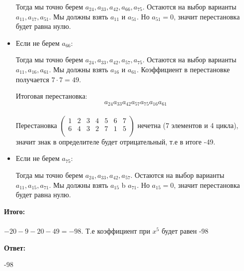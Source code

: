 \documentclass[a4paper,12pt]{article}
\begin{document}
\begin{itemize}
Тогда мы точно берем $a_{24}, a_{33}, a_{42}, a_{66}, a_{75}$. Остаются на выбор варианты $a_{11}, a_{17}, a_{51}$. Мы должны взять $a_11$ и $a_{51}$.  Но $a_{51} = 0$, значит перестановка будет равна нулю.

\item Если не берем $a_{66}$:

Тогда мы точно берем $a_{24}, a_{33}, a_{42}, a_{57}, a_{75}$. Остаются на выбор варианты $a_{11}, a_{16}, a_{61}$. Мы должны взять $a_{16} $ и $a_{61}$. Коэффициент в перестановке получается $7 \cdot 7 = 49$. 

Итоговая перестановка:
\[
a_{24}a_{33}a_{42}a_{57}a_{75} a_{16} a_{61}
\]
\\
Перестановка $\begin{pmatrix}
1 & 2 & 3 & 4 & 5 & 6 & 7\\
6 & 4 & 3& 2& 7 & 1& 5 \\
\end{pmatrix}$ нечетна (7 элементов и 4 цикла), значит знак в определителе будет отрицательный, т.е в итоге -49.
\item Если не берем $a_{75}$:

Тогда мы точно берем $a_{24}, a_{33}, a_{42}, a_{57}$. Остаются на выбор варианты $a_{11}, a_{15}, a_{71}$.  Мы должны взять $a_{15}$  b $a_{71}$. Но $a_{15} = 0$, значит перестановка будет равна нулю.
\end{itemize}

\textbf{Итого:} 
\\\\
$-20 - 9 - 20 - 49 = -98$. Т.е коэффициент при $x^5$ будет равен -98

\begin{center}
\textbf{Ответ:}

-98
\end{center}
\end{document}
